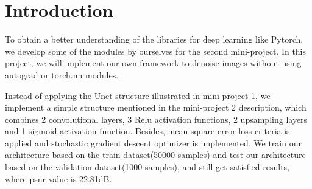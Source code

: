 \section{Introduction}
To obtain a better understanding of the libraries for deep learning like Pytorch, we develop some of the modules by ourselves for the second mini-project. In this project, we will implement our own framework to denoise images without using autograd or torch.nn modules.

Instead of applying the Unet structure illustrated in mini-project 1, we implement a simple structure mentioned in the mini-project 2 description, which combines 2 convolutional layers, 3 Relu activation functions, 2 upsampling layers and 1 sigmoid activation function. Besides, mean square error loss criteria is applied and stochastic gradient descent optimizer is implemented. We train our architecture based on the train dataset(50000 samples) and test our architecture based on the validation dataset(1000 samples), and still get satisfied results, where psnr value is 22.81dB.